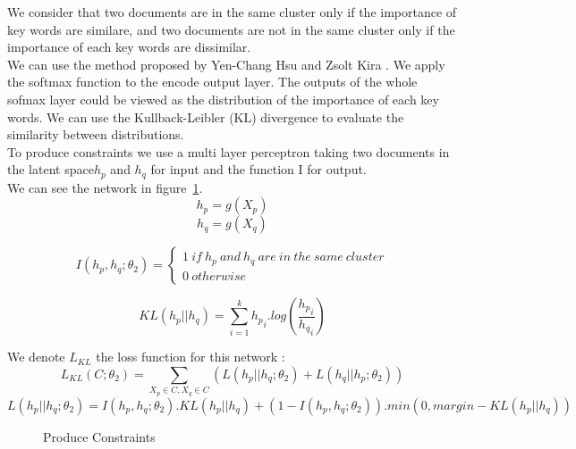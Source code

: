 \documentclass{article}
\begin{document}
We consider that two documents are in the same cluster only if the
importance of key words are similare, and two documents are not in the
same cluster only if the importance of each key words are dissimilar.
\\
We can use the method proposed by Yen-Chang Hsu and Zsolt Kira
\cite{2015arXiv151106321H}. We apply the softmax function to the
encode output layer. The outputs of the whole sofmax layer could be viewed as
the distribution of the importance of each key words. We can use the
Kullback-Leibler (KL) divergence to evaluate the similarity between
distributions.
\\
To produce constraints we use a multi layer perceptron taking two
documents in the latent space$h_p$ and $h_q$ for input and the function I for
output.
\\
We can see the network in figure~\ref{fig:final_archi}.
\begin{equation}
  h_p = g(X_p)
\end{equation}
\begin{equation}
  h_q = g(X_q)
\end{equation}

\begin{equation}\label{eq:Is}
I(h_p, h_q; \theta_2) = \left\{
    \begin{array}{ll}
        1~if~h_p~and~h_q~are~in~the~same~cluster \\
        0~otherwise
    \end{array}
\right.
\end{equation}

\begin{equation}\label{eq:KL}
KL(h_p || h_q) = \sum_{i=1}^k {h_p}_i . log(\frac{{h_p}_i}{{h_q}_i}) 
\end{equation}

We denote $L_{KL}$ the loss function for this network :
\begin{equation}\label{eq:LossKL}
  L_{KL}(C ; \theta_2) = \sum_{X_p \in C, X_q \in C}(L(h_p || h_q; \theta_2) +
  L(h_q || h_p;\theta_2)) 
\end{equation}
\begin{equation}\label{eq:KLpq}
  L(h_p || h_q; \theta_2) = I(h_p, h_q; \theta_2) . KL(h_p || h_q) +
  (1-I(h_p, h_q; \theta_2)) . min(0, margin - KL(h_p || h_q))
\end{equation}

\begin{figure}[!t]
  \centering
  
  \caption{Produce Constraints}
  \label{fig:final_archi}
\end{figure}
\end{document}
